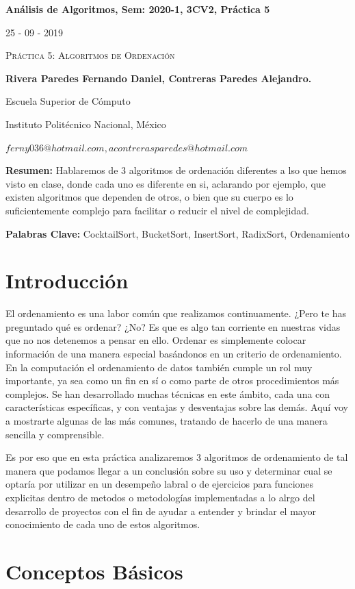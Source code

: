 \documentclass[12pt,twoside]{article}
\begin{document}
\centerline{\bf An\'alisis de Algoritmos, Sem: 2020-1, 3CV2, Pr\'actica 5}
\centerline{}
\centerline{25 - 09 - 2019}
\begin{center}
\Large{\textsc{Pr\'actica 5: Algoritmos de Ordenación}}
\end{center}
\centerline{}
\centerline{\bf {Rivera Paredes Fernando Daniel, Contreras Paredes Alejandro.}}
\centerline{}
\centerline{Escuela Superior de C\'omputo}
\centerline{Instituto Polit\'ecnico Nacional, M\'exico}
\centerline{$ferny036@hotmail.com, acontrerasparedes@hotmail.com$}
\newtheorem{Theorem}{\quad Theorem}[section] \newtheorem{Definition}[Theorem]{\quad Definition} \newtheorem{Corollary}[Theorem]{\quad Corollary} \newtheorem{Lemma}[Theorem]{\quad Lemma} \newtheorem{Example}[Theorem]{\quad Example} \bigskip
\textbf{Resumen:} Hablaremos de 3 algoritmos de ordenación diferentes a lso que hemos visto en clase, donde cada uno es diferente en si, aclarando por ejemplo, que existen algoritmos que dependen de otros, o bien que su cuerpo es lo 
suficientemente complejo para facilitar o reducir el nivel de complejidad.
\centerline{}
{\bf Palabras Clave:} CocktailSort, BucketSort, InsertSort, RadixSort, Ordenamiento
\newpage

\section{Introducción}
El ordenamiento es una labor común que realizamos continuamente. ¿Pero te has preguntado qué es ordenar? ¿No? Es que es algo tan corriente en nuestras vidas que no nos detenemos a pensar en ello. Ordenar es simplemente colocar información de 
una manera especial basándonos en un criterio de ordenamiento. En la computación el ordenamiento de datos también cumple un rol muy importante, ya sea como un fin en sí o como parte de otros procedimientos más complejos. Se han desarrollado 
muchas técnicas en este ámbito, cada una con características específicas, y con ventajas y desventajas sobre las demás. Aquí voy a mostrarte algunas de las más comunes, tratando de hacerlo de una manera sencilla y comprensible.
\centerline{}
Es por eso que en esta práctica analizaremos 3 algoritmos de ordenamiento de tal manera que podamos llegar a un conclusión sobre su uso y determinar cual se optaría por utilizar en un desempeño labral o de ejercicios para funciones explicitas
dentro de metodos o metodologías implementadas a lo alrgo del desarrollo de proyectos con el fin de ayudar a entender y brindar el mayor conocimiento de cada uno de estos algoritmos.
\newpage
\section{Conceptos B\'asicos} 
\end{document}
